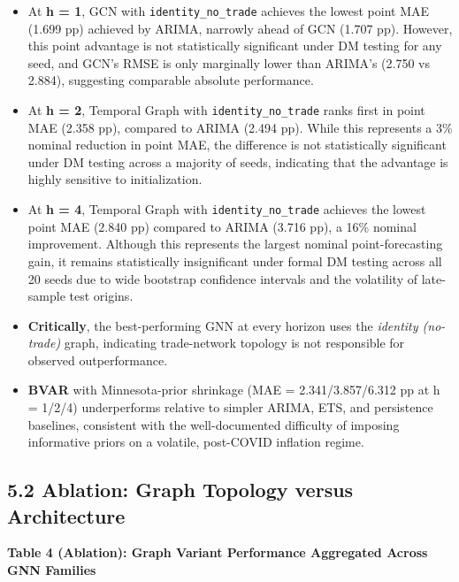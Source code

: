 \documentclass[
]{article}
\providecommand{\tightlist}{%
  \setlength{\itemsep}{0pt}\setlength{\parskip}{0pt}}
\begin{document}
\begin{itemize}
\tightlist
\item
  At \textbf{h = 1}, GCN with \texttt{identity\_no\_trade} achieves the
  lowest point MAE (1.699 pp) achieved by ARIMA, narrowly ahead of GCN (1.707 pp). However,
  this point advantage is not statistically significant under DM testing for
  any seed, and GCN's RMSE is only marginally lower than ARIMA's (2.750 vs
  2.884), suggesting comparable absolute performance.
\item
  At \textbf{h = 2}, Temporal Graph with \texttt{identity\_no\_trade}
  ranks first in point MAE (2.358 pp), compared to ARIMA (2.494 pp). While
  this represents a 3\% nominal reduction in point MAE, the difference is not
  statistically significant under DM testing across a majority of seeds,
  indicating that the advantage is highly sensitive to initialization.
\item
  At \textbf{h = 4}, Temporal Graph with \texttt{identity\_no\_trade}
  achieves the lowest point MAE (2.840 pp) compared to ARIMA (3.716 pp), a
  16\% nominal improvement. Although this represents the largest nominal
  point-forecasting gain, it remains statistically insignificant under formal
  DM testing across all 20 seeds due to wide bootstrap confidence intervals
  and the volatility of late-sample test origins.
\item
  \textbf{Critically}, the best-performing GNN at every horizon uses the
  \emph{identity (no-trade)} graph, indicating trade-network topology is
  not responsible for observed outperformance.
\item
  \textbf{BVAR} with Minnesota-prior shrinkage (MAE = 2.341/3.857/6.312 pp
  at h = 1/2/4) underperforms relative to simpler ARIMA, ETS, and
  persistence baselines, consistent with the well-documented difficulty of
  imposing informative priors on a volatile, post-COVID inflation regime.
\end{itemize}

\subsection{5.2 Ablation: Graph Topology versus
Architecture}\label{ablation-graph-topology-versus-architecture}

\textbf{Table 4 (Ablation): Graph Variant Performance Aggregated Across
GNN Families}
\end{document}
